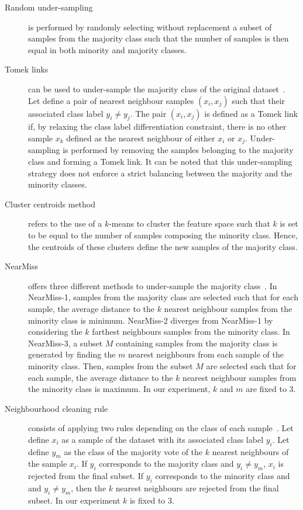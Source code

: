 \documentclass[twoside,11pt]{article}
\begin{document}
\begin{description}
  \item[Random under-sampling] is performed by randomly selecting without replacement a subset of samples from the majority class such that the number of samples is then equal in both minority and majority classes.
  \item[Tomek links] can be used to under-sample the majority class of the original dataset~\cite{tomek1976two}.
Let define a pair of nearest neighbour samples $(x_i, x_j)$ such that their associated class label $y_i \neq y_j$.
The pair $(x_i, x_j)$ is defined as a Tomek link if, by relaxing the class label differentiation constraint, there is no other sample $x_k$ defined as the nearest neighbour of either $x_i$ or $x_j$.
Under-sampling is performed by removing the samples belonging to the majority class and forming a Tomek link.
It can be noted that this under-sampling strategy does not enforce a strict balancing between the majority and the minority classes.
  \item[Cluster centroids method] refers to the use of a $k$-means to cluster the feature space such that $k$ is set to be equal to the number of samples composing the minority class.
Hence, the centroids of these clusters define the new samples of the majority class. 
  \item[NearMiss] offers three different methods to under-sample the majority class~\cite{mani2003knn}.
In NearMiss-1, samples from the majority class are selected such that for each sample, the average distance to the $k$ nearest neighbour samples from the minority class is minimum.
NearMiss-2 diverges from NearMiss-1 by considering the $k$ farthest neighbours samples from the minority class.
In NearMiss-3, a subset $M$ containing samples from the majority class is generated by finding the $m$ nearest neighbours from each sample of the minority class.
Then, samples from the subset $M$ are selected such that for each sample, the average distance to the $k$ nearest neighbour samples from the minority class is maximum.
In our experiment, $k$ and $m$ are fixed to 3.
  \item[Neighbourhood cleaning rule] consists of applying two rules depending on the class of each sample~\cite{laurikkala2001improving}.
Let define $x_i$ as a sample of the dataset with its associated class label $y_i$.
Let define $y_m$ as the class of the majority vote of the $k$ nearest neighbours of the sample $x_i$.
If $y_i$ corresponds to the majority class and $y_i \neq y_m$, $x_i$ is rejected from the final subset.
If $y_i$ corresponds to the minority class and and $y_i \neq y_m$, then the $k$ nearest neighbours are rejected from the final subset.
In our experiment $k$ is fixed to 3.
\end{description}
\end{document}

